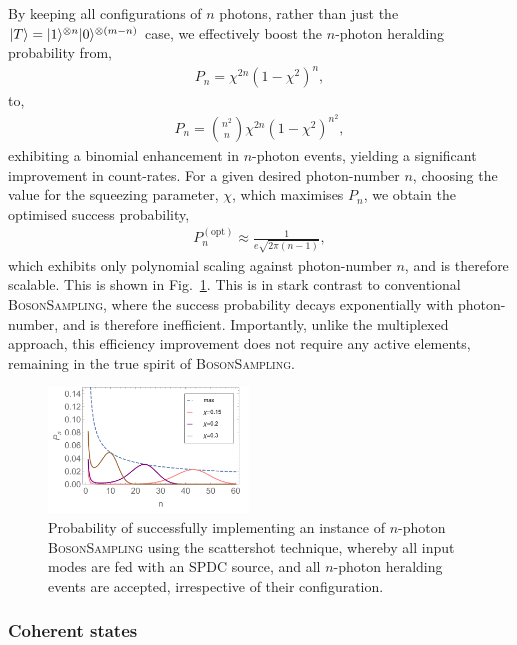 By keeping all configurations of $n$ photons, rather than just the \mbox{$|T\rangle=|1\rangle^{\otimes n} |0\rangle^{\otimes (m-n)}$} case, we effectively boost the $n$-photon heralding probability from,
\begin{align}
	P_n = \chi^{2n}(1-\chi^2)^n,	
\end{align}
to,
\begin{align}
	P_n = \binom{n^2}{n}\chi^{2n}(1-\chi^2)^{n^2},	
\end{align}
exhibiting a binomial enhancement in $n$-photon events, yielding a significant improvement in count-rates. For a given desired photon-number $n$, choosing the value for the squeezing parameter, $\chi$, which maximises $P_n$, we obtain the optimised success probability,
\begin{align}
	P_n^{(\mathrm{opt})} \approx \frac{1}{e\sqrt{2\pi(n-1)}},
\end{align}
which exhibits only polynomial scaling against photon-number $n$, and is therefore scalable. This is shown in Fig.~\ref{fig:scattershot_probs}. This is in stark contrast to conventional \textsc{BosonSampling}, where the success probability decays exponentially with photon-number, and is therefore inefficient. Importantly, unlike the multiplexed approach, this efficiency improvement does not require any active elements, remaining in the true spirit of \textsc{BosonSampling}.

\begin{figure}[!htbp]
\includegraphics[clip=true, width=0.475\textwidth]{scattershot_probs}
\captionspacefig \caption{Probability of successfully implementing an instance of $n$-photon \textsc{BosonSampling} using the scattershot technique, whereby all input modes are fed with an SPDC source, and all $n$-photon heralding events are accepted, irrespective of their configuration.} \label{fig:scattershot_probs}
\end{figure}

%
%

\subsubsection{Coherent states} \label{sec:coherent_state_QC} 

